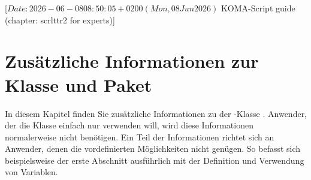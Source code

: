%
%
%
%
%
%
%

%
                 [$Date: 2026-06-08 08:50:05 +0200 (Mon, 08 Jun 2026) $
                  KOMA-Script guide (chapter: scrlttr2 for experts)]

\chapter{Zusätzliche Informationen zur
  Klasse  und Paket }

\BeginIndexGroup%
%
In diesem Kapitel finden Sie zusätzliche Informationen zu der
\KOMAScript-Klasse . %
Anwender, der die Klasse einfach nur verwenden will, wird diese Informationen
normalerweise nicht benötigen. Ein Teil der Informationen richtet sich an
Anwender, denen die vordefinierten Möglichkeiten nicht genügen. So
befasst sich beispielsweise der erste Abschnitt ausführlich mit der Definition
und Verwendung von Variablen.%

